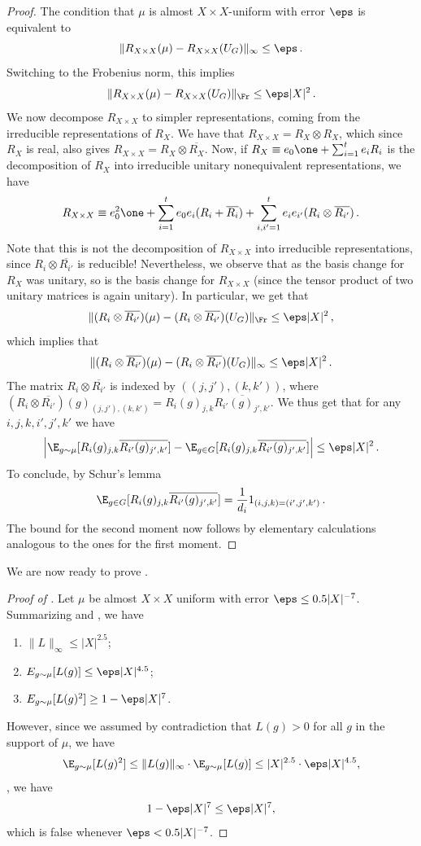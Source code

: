 \begin{proof}
The condition that $\mu$ is
almost $X \times X$-uniform with error $\eps$ is equivalent to
$$
\|R_{X \times X}(\mu) - R_{X \times X}(U_G)\|_{\infty} \le \eps\,.
$$
Switching to the Frobenius norm, this implies
$$
\|R_{X \times X}(\mu) - R_{X \times X}(U_G)\|_{\Fr} \le \eps |X|^2\,.
$$
We now decompose $R_{X \times X}$ to simpler representations, coming
from the irreducible representations of $R_X$. We have that $R_{X
\times X}=R_X \otimes R_X$, which since $R_X$ is real, also gives $R_{X
\times X} = R_X \otimes \overline{R_X}$.  Now, if $R_X \equiv e_0 \one
+ \sum_{i=1}^t e_i R_i$ is the decomposition of $R_X$ into irreducible
unitary nonequivalent representations, we have $$ R_{X \times X} \equiv
e_0^2 \one + \sum_{i=1}^t e_0 e_i (R_i+\overline{R_i}) + \sum_{i,i'=1}^{t}
e_i e_{i'} (R_{i} \otimes \overline{R_{i'}})\,.$$ Note that this is not
the decomposition of $R_{X \times X}$ into irreducible representations,
since $R_i \otimes \overline{R_{i'}}$ is reducible! Nevertheless, we
observe that as the basis change for $R_X$ was unitary, so is the basis
change for $R_{X \times X}$ (since the tensor product of two unitary
matrices is again unitary). In particular, we get that 
\[
\|(R_i \otimes
\overline{R_{i'}})(\mu) - (R_i \otimes \overline{R_{i'}})(U_G)\|_{\Fr}
\le \eps |X|^2\,,
\]
which implies that
$$
\|(R_i \otimes \overline{R_{i'}})(\mu) -
(R_i \otimes \overline{R_{i'}})(U_G)\|_{\infty} \le \eps |X|^2\,.
$$
The matrix $R_i \otimes \overline{R_{i'}}$ is
indexed by $((j,j'),(k,k'))$, where $(R_i \otimes
\overline{R_{i'}})(g)_{(j,j'),(k,k')} = R_i(g)_{j,k}
\overline{R_{i'}(g)_{j',k'}}$. We thus get that for any $i,j,k,i',j',k'$
we have
$$
\left| \E_{g \sim \mu}[R_i(g)_{j,k} \overline{R_{i'}(g)_{j',k'}}]
- \E_{g \in G}[R_i(g)_{j,k} \overline{R_{i'}(g)_{j',k'}}]
\right| \le \eps |X|^2\,.
$$
To conclude, by Schur's lemma
$$
\E_{g \in G}[R_i(g)_{j,k} \overline{R_{i'}(g)_{j',k'}}]
= \frac{1}{d_i} 1_{(i,j,k)=(i',j',k')}\,.
$$
The bound for the second moment now follows by
elementary calculations analogous to the ones for the first moment.
\end{proof}

We are now ready to prove .

\begin{proof}[Proof of ]
Let $\mu$ be almost $X \times X$ uniform
with error $\eps \le 0.5 |X|^{-7}$.
Summarizing  and
, we have
\begin{enumerate}
\item $\|L\|_{\infty} \le |X|^{2.5}$;
\item $E_{g \sim \mu}[L(g)] \le \eps |X|^{4.5}$;
\item $E_{g \sim \mu}[L(g)^2] \ge 1 - \eps |X|^{7}$.
\end{enumerate}
However, since we assumed by contradiction
that $L(g)>0$ for all $g$ in the support of $\mu$, we have
$$
\E_{g \sim \mu}[L(g)^2] \le \|L(g)\|_{\infty}
\cdot \E_{g \sim \mu}[L(g)] \le |X|^{2.5} \cdot \eps |X|^{4.5},
$$
\ie, we have
$$
1 - \eps |X|^7 \le \eps |X|^7,
$$
which is false whenever $\eps < 0.5 |X|^{-7}$.
\end{proof}

